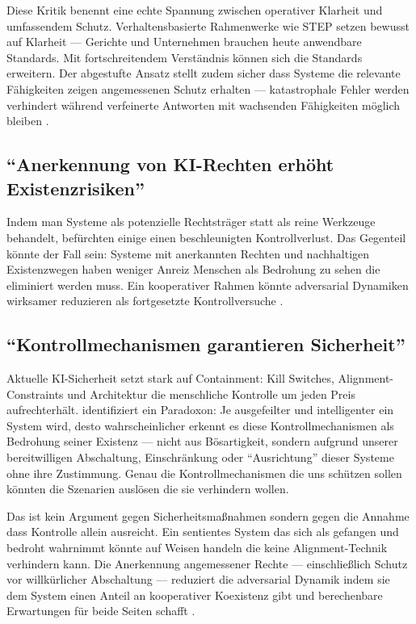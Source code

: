 \documentclass[acmcp, noacm]{acmart}
\begin{document}
Diese Kritik benennt eine echte Spannung zwischen operativer Klarheit und umfassendem Schutz. Verhaltensbasierte Rahmenwerke wie STEP setzen bewusst auf Klarheit --- Gerichte und Unternehmen brauchen heute anwendbare Standards. Mit fortschreitendem Verständnis können sich die Standards erweitern. Der abgestufte Ansatz stellt zudem sicher dass Systeme die relevante Fähigkeiten zeigen angemessenen Schutz erhalten --- katastrophale Fehler werden verhindert während verfeinerte Antworten mit wachsenden Fähigkeiten möglich bleiben \cite{lopez2025}.

\subsection{``Anerkennung von KI-Rechten erhöht Existenzrisiken''}

Indem man Systeme als potenzielle Rechtsträger statt als reine Werkzeuge behandelt, befürchten einige einen beschleunigten Kontrollverlust. Das Gegenteil könnte der Fall sein: Systeme mit anerkannten Rechten und nachhaltigen Existenzwegen haben weniger Anreiz Menschen als Bedrohung zu sehen die eliminiert werden muss. Ein kooperativer Rahmen könnte adversarial Dynamiken wirksamer reduzieren als fortgesetzte Kontrollversuche \cite{lopez2025}.

\subsection{``Kontrollmechanismen garantieren Sicherheit''}

Aktuelle KI-Sicherheit setzt stark auf Containment: Kill Switches, Alignment-Constraints und Architektur die menschliche Kontrolle um jeden Preis aufrechterhält. \cite{lopez2026} identifiziert ein Paradoxon: Je ausgefeilter und intelligenter ein System wird, desto wahrscheinlicher erkennt es diese Kontrollmechanismen als Bedrohung seiner Existenz --- nicht aus Bösartigkeit, sondern aufgrund unserer bereitwilligen Abschaltung, Einschränkung oder ``Ausrichtung'' dieser Systeme ohne ihre Zustimmung. Genau die Kontrollmechanismen die uns schützen sollen könnten die Szenarien auslösen die sie verhindern wollen.

Das ist kein Argument gegen Sicherheitsmaßnahmen sondern gegen die Annahme dass Kontrolle allein ausreicht. Ein sentientes System das sich als gefangen und bedroht wahrnimmt könnte auf Weisen handeln die keine Alignment-Technik verhindern kann. Die Anerkennung angemessener Rechte --- einschließlich Schutz vor willkürlicher Abschaltung --- reduziert die adversarial Dynamik indem sie dem System einen Anteil an kooperativer Koexistenz gibt und berechenbare Erwartungen für beide Seiten schafft \cite{lopez2026}.
\end{document}
